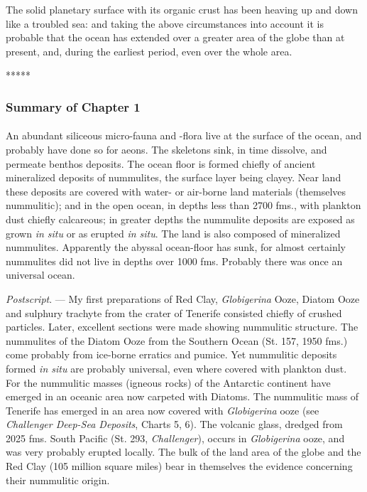 \documentclass[a4paper, 12pt, oneside, landscape]{article}
\begin{document}
The solid planetary surface with its organic crust has been heaving up and down like a troubled sea: and taking the above circumstances into account it is probable that the ocean has extended over a greater area of the globe than at present, and, during the earliest period, even over the whole area.

\centerline{*\hspace{15mm}*\hspace{15mm}*\hspace{15mm}*\hspace{15mm}*}
\bigskip

\subsubsection{Summary of Chapter 1}
\paragraph{}
An abundant siliceous micro-fauna and -flora live at the surface of the ocean, and probably have done so for aeons. The skeletons sink, in time dissolve, and permeate benthos deposits. The ocean floor is formed chiefly of ancient mineralized deposits of nummulites, the surface layer being clayey. Near land these deposits are covered with water- or air-borne land materials (themselves nummulitic); and in the open ocean, in depths less than 2700 fms., with plankton dust chiefly calcareous; in greater depths the nummulite deposits are exposed as grown \emph{in situ} or as erupted \emph{in situ}. The land is also composed of mineralized nummulites. Apparently the abyssal ocean-floor has sunk, for almost certainly nummulites did not live in depths over 1000 fms. Probably there was once an universal ocean.

\emph{Postscript}. --- My first preparations of Red Clay, \emph{Globigerina} Ooze, Diatom Ooze and sulphury trachyte from the crater of Tenerife consisted chiefly of crushed particles. Later, excellent sections were made showing nummulitic structure. The nummulites of the Diatom Ooze from the Southern Ocean (St. 157, 1950 fms.) come probably from ice-borne erratics and pumice. Yet nummulitic deposits formed \emph{in situ} are probably universal, even where covered with plankton dust. For the nummulitic masses (igneous rocks) of the Antarctic continent have emerged in an oceanic area now carpeted with Diatoms. The nummulitic mass of Tenerife has emerged in an area now covered with \emph{Globigerina} ooze (see \emph{Challenger Deep-Sea Deposits}, Charts 5, 6). The volcanic glass, dredged from 2025 fms. South Pacific (St. 293, \emph{Challenger}), occurs in \emph{Globigerina} ooze, and was very probably erupted locally. The bulk of the land area of the globe and the Red Clay (105 million square miles) bear in themselves the evidence concerning their nummulitic origin.
\end{document}
